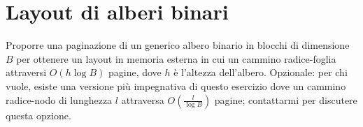 \chapter{Layout di alberi binari}

\begin{problem*}
    Proporre una paginazione di  un generico albero binario in blocchi di
    dimensione \(B\) per ottenere un layout in memoria esterna in cui un
    cammino radice-foglia attraversi \(O(h\log{B})\) pagine, dove \(h\) \`e 
    l'altezza dell'albero. Opzionale: per chi vuole, esiste una versione pi\`u  
    impegnativa di questo esercizio dove un cammino radice-nodo di lunghezza
    \(l\) attraversa \(O(\frac{l}{\log{B}})\) pagine; contattarmi per discutere
    questa opzione.
\end{problem*}
